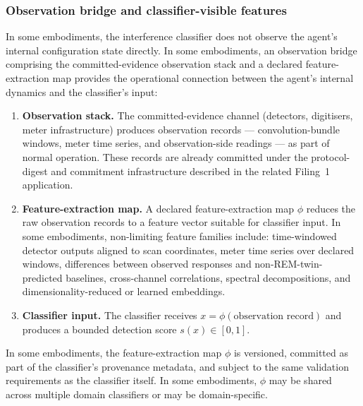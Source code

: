 \documentclass[a4paper,12pt]{article}
\newcommand{\cba}{convolution-bundle\xspace}
\begin{document}

\subsubsection{Observation bridge and classifier-visible features}
\label{sec:observation-bridge}

In some embodiments, the interference classifier does not observe
the agent's internal configuration state directly. In some
embodiments, an observation bridge comprising the committed-evidence
observation stack and a declared feature-extraction map provides the
operational connection between the agent's internal dynamics and the
classifier's input:

\begin{enumerate}
  \item \textbf{Observation stack.} The committed-evidence channel
    (detectors, digitisers, meter infrastructure) produces
    observation records --- \cba windows, meter time
    series, and observation-side readings --- as part of normal
    operation. These records are already committed under the
    protocol-digest and commitment infrastructure described in the
    related Filing~1 application.
  \item \textbf{Feature-extraction map.} A declared
    feature-extraction map $\phi$ reduces the raw observation records
    to a feature vector suitable for classifier input. In some
    embodiments, non-limiting feature families include:
    time-windowed detector outputs aligned to scan coordinates, meter
    time series over declared windows, differences between observed
    responses and non-REM-twin-predicted baselines,
    cross-channel correlations, spectral decompositions,
    and dimensionality-reduced or learned embeddings.
  \item \textbf{Classifier input.} The classifier receives
    $x = \phi(\text{observation record})$ and produces a bounded
    detection score $s(x) \in [0,1]$.
\end{enumerate}

In some embodiments, the feature-extraction map $\phi$ is versioned,
committed as part of the classifier's provenance metadata, and
subject to the same validation requirements as the classifier itself.
In some embodiments, $\phi$ may be shared across multiple
domain classifiers or may be domain-specific.
\end{document}
